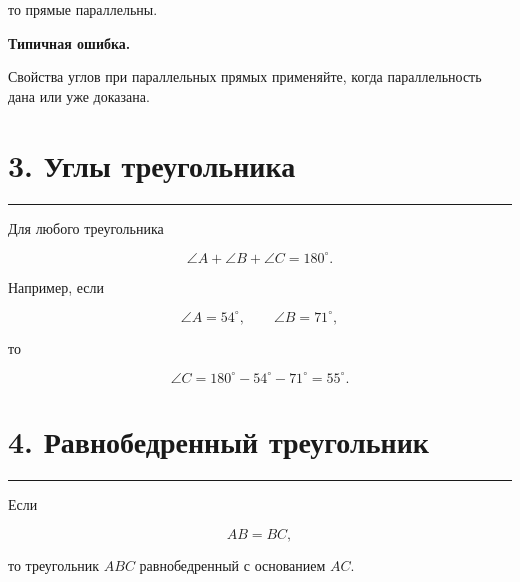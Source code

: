 \documentclass[a4paper,12pt]{article}
\newcommand{\sectionline}{
  \par
  \vspace{0.2em}
  \textcolor{lightline}{\rule{\linewidth}{0.8pt}}
  \par
  \vspace{0.35em}
}
\newcommand{\key}[1]{
  \textcolor{darkaccent}{\textbf{#1}}
}
\begin{document}
то прямые параллельны.

\key{Типичная ошибка.}
Свойства углов при параллельных прямых применяйте,
когда параллельность дана или уже доказана.


\section*{3. Углы треугольника}
\sectionline

Для любого треугольника

\[
\angle A+\angle B+\angle C=180^\circ.
\]

\begin{center}


\end{center}

Например, если

\[
\angle A=54^\circ,
\qquad
\angle B=71^\circ,
\]

то

\[
\angle C
=
180^\circ-54^\circ-71^\circ
=
55^\circ.
\]


\section*{4. Равнобедренный треугольник}
\sectionline

Если

\[
AB=BC,
\]

то треугольник $ABC$ равнобедренный
с основанием $AC$.
\end{document}
